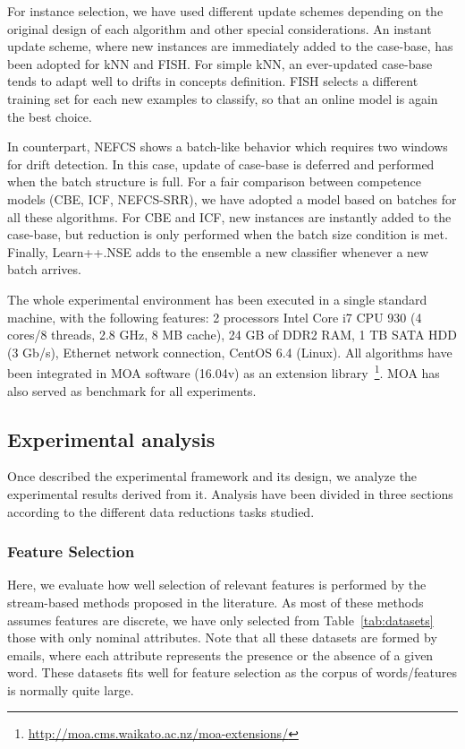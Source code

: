 \documentclass[preprint,12pt]{elsarticle}
\begin{document}
For instance selection, we have used different update schemes depending on the original design of each algorithm and other special considerations. An instant update scheme, where new instances are immediately added to the case-base, has been adopted for kNN and FISH. For simple kNN, an ever-updated case-base tends to adapt well to drifts in concepts definition. FISH selects a different training set for each new examples to classify, so that an online model is again the best choice. 

In counterpart, NEFCS shows a batch-like behavior which requires two windows for drift detection. In this case, update of case-base is deferred and performed when the batch structure is full. For a fair comparison between competence models (CBE, ICF, NEFCS-SRR), we have adopted a model based on batches for all these algorithms. For CBE and ICF, new instances are instantly added to the case-base, but reduction is only performed when the batch size condition is met. Finally, Learn++.NSE adds to the ensemble a new classifier whenever a new batch arrives. 

The whole experimental environment has been executed in a single standard machine, with the following features: 2 processors Intel Core i7 CPU 930 (4 cores/8 threads, 2.8 GHz, 8 MB cache), 24 GB of DDR2 RAM, 1 TB SATA HDD (3 Gb/s), Ethernet network connection, CentOS 6.4 (Linux). All algorithms have been integrated in MOA software (16.04v) as an extension library~\footnote{\url{http://moa.cms.waikato.ac.nz/moa-extensions/}}. MOA has also served as benchmark for all experiments.

\subsection{Experimental analysis}

Once described the experimental framework and its design, we analyze the experimental results derived from it. Analysis have been divided in three sections according to the different data reductions tasks studied.

\subsubsection*{\textbf{Feature Selection}}

Here, we evaluate how well selection of relevant features is performed by the stream-based methods proposed in the literature. As most of these methods assumes features are discrete, we have only selected from Table~\ref{tab:datasets} those with only nominal attributes. Note that all these datasets are formed by emails, where each attribute represents the presence or the absence of a given word. These datasets fits well for feature selection as the corpus of words/features is normally quite large.
\end{document}
